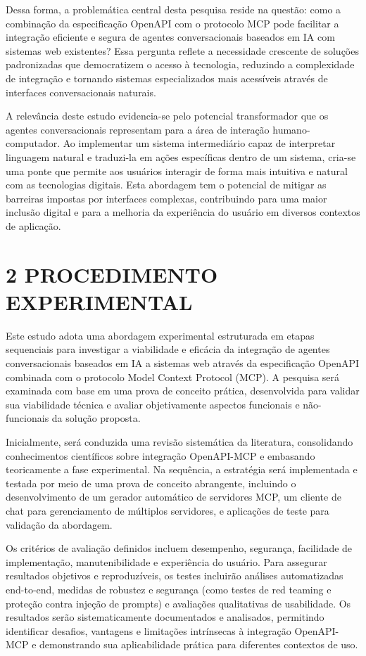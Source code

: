 \documentclass[
]{article}
\begin{document}
Dessa forma, a problemática central desta pesquisa reside na questão:
como a combinação da especificação OpenAPI com o protocolo MCP pode
facilitar a integração eficiente e segura de agentes conversacionais
baseados em IA com sistemas web existentes? Essa pergunta reflete a
necessidade crescente de soluções padronizadas que democratizem o acesso
à tecnologia, reduzindo a complexidade de integração e tornando sistemas
especializados mais acessíveis através de interfaces conversacionais
naturais.

A relevância deste estudo evidencia-se pelo potencial transformador que
os agentes conversacionais representam para a área de interação
humano-computador. Ao implementar um sistema intermediário capaz de
interpretar linguagem natural e traduzi-la em ações específicas dentro
de um sistema, cria-se uma ponte que permite aos usuários interagir de
forma mais intuitiva e natural com as tecnologias digitais. Esta
abordagem tem o potencial de mitigar as barreiras impostas por
interfaces complexas, contribuindo para uma maior inclusão digital e
para a melhoria da experiência do usuário em diversos contextos de
aplicação.

\section{2 PROCEDIMENTO EXPERIMENTAL}\label{procedimento-experimental}

Este estudo adota uma abordagem experimental estruturada em etapas
sequenciais para investigar a viabilidade e eficácia da integração de
agentes conversacionais baseados em IA a sistemas web através da
especificação OpenAPI combinada com o protocolo Model Context Protocol
(MCP). A pesquisa será examinada com base em uma prova de conceito
prática, desenvolvida para validar sua viabilidade técnica e avaliar
objetivamente aspectos funcionais e não-funcionais da solução proposta.

Inicialmente, será conduzida uma revisão sistemática da literatura,
consolidando conhecimentos científicos sobre integração OpenAPI-MCP e
embasando teoricamente a fase experimental. Na sequência, a estratégia
será implementada e testada por meio de uma prova de conceito
abrangente, incluindo o desenvolvimento de um gerador automático de
servidores MCP, um cliente de chat para gerenciamento de múltiplos
servidores, e aplicações de teste para validação da abordagem.

Os critérios de avaliação definidos incluem desempenho, segurança,
facilidade de implementação, manutenibilidade e experiência do usuário.
Para assegurar resultados objetivos e reproduzíveis, os testes incluirão
análises automatizadas end-to-end, medidas de robustez e segurança (como
testes de red teaming e proteção contra injeção de prompts) e avaliações
qualitativas de usabilidade. Os resultados serão sistematicamente
documentados e analisados, permitindo identificar desafios, vantagens e
limitações intrínsecas à integração OpenAPI-MCP e demonstrando sua
aplicabilidade prática para diferentes contextos de uso.
\end{document}
